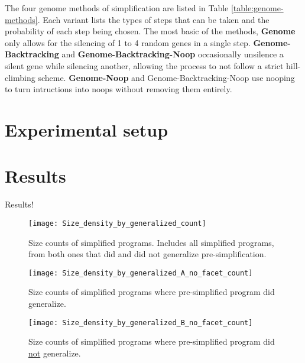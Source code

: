 The four genome methods of simplification are listed in Table \ref{table:genome-methods}. Each variant lists the types of steps that can be taken and the probability of each step being chosen. The most basic of the methods, \textbf{Genome} only allows for the silencing of 1 to 4 random genes in a single step. \textbf{Genome-Backtracking} and \textbf{Genome-Backtracking-Noop} occasionally unsilence a silent gene while silencing another, allowing the process to not follow a strict hill-climbing scheme.  \textbf{Genome-Noop} and Genome-Backtracking-Noop use nooping to turn intructions into noops without removing them entirely.



\section{Experimental setup}
\label{sec:setup}






\section{Results}
\label{sec:results}


Results!

\begin{figure}[t] %
\centering
\texttt{[image: Size\_density\_by\_generalized\_count]}
\caption{Size counts of simplified programs. Includes all simplified programs, from both ones that did and did not generalize pre-simplification.}
\label{fig:count:gen}
\end{figure}

\begin{figure}[t] %
\centering
\texttt{[image: Size\_density\_by\_generalized\_A\_no\_facet\_count]}
\caption{Size counts of simplified programs where pre-simplified program did generalize.}
\label{fig:count:pre-simp-gen-true}
\end{figure}

\begin{figure}[t] %
\centering
\texttt{[image: Size\_density\_by\_generalized\_B\_no\_facet\_count]}
\caption{Size counts of simplified programs where pre-simplified program did \underline{not} generalize.}
\label{fig:count:pre-simp-gen-true}
\end{figure}


